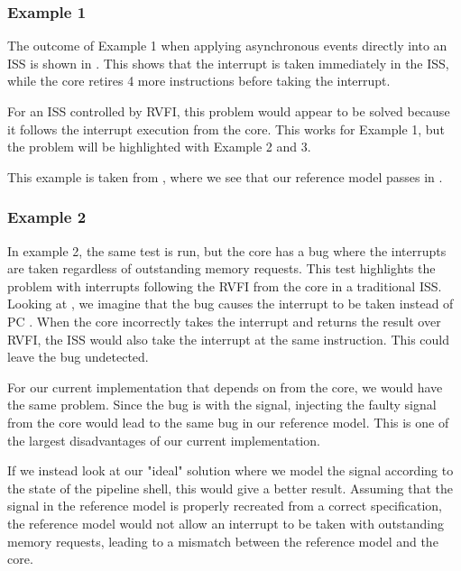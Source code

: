 

\subsubsection{Example 1}

The outcome of Example 1 when applying asynchronous events directly into an ISS is shown in . This shows that the interrupt is taken immediately in the ISS, while the core retires 4 more instructions before taking the interrupt.

For an ISS controlled by RVFI, this problem would appear to be solved because it follows the interrupt execution from the core. This works for Example 1, but the problem will be highlighted with Example 2 and 3.

This example is taken from , where we see that our reference model passes in .

\subsubsection{Example 2}

In example 2, the same test is run, but the core has a bug where the interrupts are taken regardless of outstanding memory requests. This test highlights the problem with interrupts following the RVFI from the core in a traditional ISS. 
Looking at , we imagine that the bug causes the interrupt to be taken instead of PC . When the core incorrectly takes the interrupt and returns the result over RVFI, the ISS would also take the interrupt at the same instruction. This could leave the bug undetected.

For our current implementation that depends on  from the core, we would have the same problem. Since the bug is with the  signal, injecting the faulty signal from the core would lead to the same bug in our reference model. This is one of the largest disadvantages of our current implementation. 

If we instead look at our "ideal" solution where we model the  signal according to the state of the pipeline shell, this would give a better result. Assuming that the  signal in the reference model is properly recreated from a correct specification, the reference model would not allow an interrupt to be taken with outstanding memory requests, leading to a mismatch between the reference model and the core.


